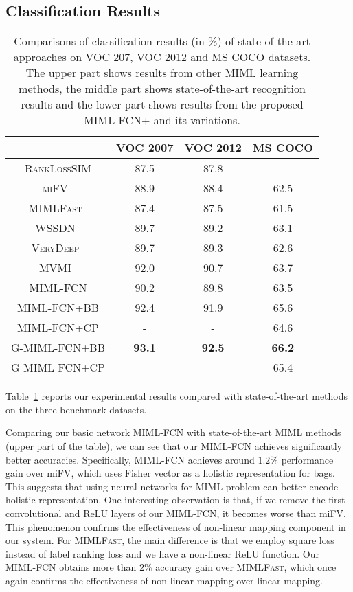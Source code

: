 \documentclass[10pt,twocolumn,letterpaper]{article}
\begin{document}
\subsection{Classification Results}
\begin{table}
	\small
	\centering \caption{Comparisons of classification results (in \%) of state-of-the-art approaches on \textsc{VOC 207}, \textsc{VOC 2012} and \textsc{MS COCO} datasets. The upper part shows results from other MIML learning methods, the middle part shows state-of-the-art recognition results and the lower part shows results from the proposed \textsc{MIML-FCN+} and its variations.}
	\begin{tabular}{ c | c | c | c}
		\hline
		&\textsc{VOC 2007} &\textsc{VOC 2012} &\textsc{MS COCO} \\ \hline
		\textsc{RankLossSIM\cite{Briggs2012}} &87.5 &87.8 &- \\
		\textsc{miFV~\cite{Wu2014}} &88.9 &88.4 &62.5\\
		\textsc{MIMLFast~\cite{Huang2014}} &87.4 &87.5 &61.5\\
		\hline
		\hline
		\textsc{WSSDN~\cite{Bilen2016}} &89.7 &89.2 &63.1 \\
		\textsc{VeryDeep~\cite{Simonyan2014}} &89.7 &89.3 &62.6\\
		\textsc{MVMI~\cite{Yang2016a}} &92.0 &90.7 &63.7\\
		\hline
		\hline
		\textsc{MIML-FCN} &90.2 &89.8 &63.5 \\
		\textsc{MIML-FCN+BB} &92.4 &91.9 &65.6\\
		\textsc{MIML-FCN+CP} &- &- &64.6\\
		\textsc{G-MIML-FCN+BB} &\textbf{93.1} &\textbf{92.5} &\textbf{66.2}\\
		\textsc{G-MIML-FCN+CP} &- &- &65.4\\
	\end{tabular}
	\label{res}
\end{table}
Table~\ref{res} reports our experimental results compared with
state-of-the-art methods on the three benchmark datasets.

Comparing our basic network \textsc{MIML-FCN} with
state-of-the-art MIML methods (upper part of the table), we can
see that our MIML-FCN achieves significantly better accuracies.
Specifically, \textsc{MIML-FCN} achieves around $1.2\%$
performance gain over miFV, which uses Fisher vector as a holistic
representation for bags. This suggests that using neural networks
for MIML problem can better encode holistic representation. One
interesting observation is that, if we remove the first
convolutional and ReLU layers of our \textsc{MIML-FCN}, it becomes
worse than miFV. This phenomenon confirms the effectiveness of
non-linear mapping component in our system. For \textsc{MIMLFast},
the main difference is that we employ square loss instead of label
ranking loss and we have a non-linear ReLU function. Our MIML-FCN
obtains more than $2\%$ accuracy gain over \textsc{MIMLFast},
which once again confirms the effectiveness of non-linear mapping
over linear mapping.
\end{document}
